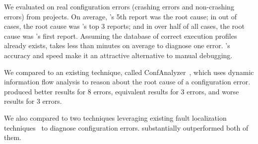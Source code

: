 We evaluated \ourtool on \errors real configuration errors
(\crash crashing errors and \noncrash non-crashing errors)
from \subjectnum projects.
On average, \ourtool's 5th report was the root cause; in
\topnum out of \errors cases, the root cause was \ourtool's
top 3 reports; and in over half of all
cases, the root cause was \ourtool's first report.
Assuming the database of correct execution profiles already exists,
\ourtool takes less than \avgtime minutes on average to diagnose
one error.  \ourtool's accuracy and speed make it an attractive alternative
to manual debugging.


We compared \ourtool to an existing technique, called ConfAnalyzer~\cite{Rabkin:2011:PPC},
which uses dynamic information flow analysis to reason about the root cause of a
configuration error. \ourtool produced better results for 8 errors,
equivalent results for 3 errors, and worse results for 3 errors.


We also compared \ourtool to two techniques leveraging
existing fault localization techniques~\cite{Jones:2002, McCamant:2003}
to diagnose configuration errors. 
\ourtool substantially outperformed both of them.





